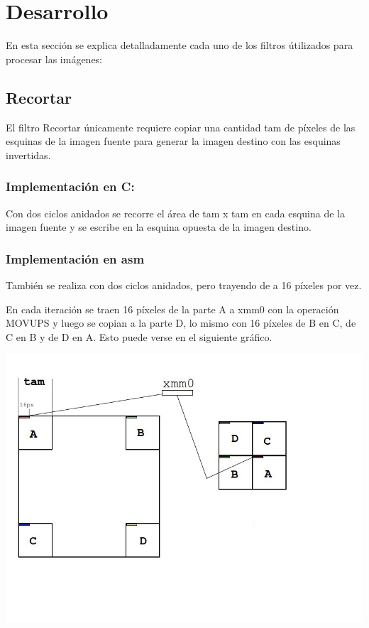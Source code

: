 \section{Desarrollo}

En esta secci\'on se explica detalladamente cada uno de los filtros \'utilizados para procesar las im\'agenes:

\subsection{Recortar}
El filtro Recortar \'unicamente requiere copiar una cantidad tam de p\'ixeles de las esquinas de la imagen fuente para generar la imagen destino con las esquinas invertidas.
\subsubsection{Implementaci\'on en C:}
Con dos ciclos anidados se recorre el \'area de tam x tam en cada esquina de la imagen fuente y se escribe en la esquina opuesta de la imagen destino.
\subsubsection{Implementaci\'on en asm}
Tambi\'en se realiza con dos ciclos anidados, pero trayendo de a 16 p\'ixeles por vez.\newline

En cada iteración se traen 16 p\'ixeles de la parte A a xmm0 con la operaci\'on MOVUPS y luego se copian a la parte D, lo mismo con 16 p\'ixeles de B en C, de C en B y de D en A. Esto puede verse en el siguiente gr\'afico.
\begin{center}
\includegraphics[scale=0.5]{recortar.jpg}
\end{center}
